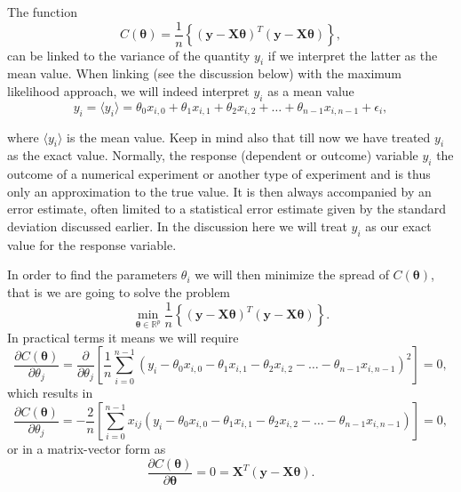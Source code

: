 \documentclass[%
oneside,                 %
final,                   %
10pt]{article}
\newenvironment{block_mdfboxadmon}[1][]{
\begin{block_mdfboxmdframed}[frametitle=#1]
}
{
\end{block_mdfboxmdframed}
}
\begin{document}

\begin{block_mdfboxadmon}[]

The function 
\[
C(\bm{\theta})=\frac{1}{n}\left\{\left(\bm{y}-\bm{X}\bm{\theta}\right)^T\left(\bm{y}-\bm{X}\bm{\theta}\right)\right\},
\]
can be linked to the variance of the quantity $y_i$ if we interpret the latter as the mean value. 
When linking (see the discussion below) with the maximum likelihood approach, we will indeed interpret $y_i$ as a mean value
\[
y_{i}=\langle y_i \rangle = \theta_0x_{i,0}+\theta_1x_{i,1}+\theta_2x_{i,2}+\dots+\theta_{n-1}x_{i,n-1}+\epsilon_i,
\]

where $\langle y_i \rangle$ is the mean value. Keep in mind also that
till now we have treated $y_i$ as the exact value. Normally, the
response (dependent or outcome) variable $y_i$ the outcome of a
numerical experiment or another type of experiment and is thus only an
approximation to the true value. It is then always accompanied by an
error estimate, often limited to a statistical error estimate given by
the standard deviation discussed earlier. In the discussion here we
will treat $y_i$ as our exact value for the response variable.

In order to find the parameters $\theta_i$ we will then minimize the spread of $C(\bm{\theta})$, that is we are going to solve the problem
\[
{\displaystyle \min_{\bm{\theta}\in
{\mathbb{R}}^{p}}}\frac{1}{n}\left\{\left(\bm{y}-\bm{X}\bm{\theta}\right)^T\left(\bm{y}-\bm{X}\bm{\theta}\right)\right\}.
\]
In practical terms it means we will require
\[
\frac{\partial C(\bm{\theta})}{\partial \theta_j} = \frac{\partial }{\partial \theta_j}\left[ \frac{1}{n}\sum_{i=0}^{n-1}\left(y_i-\theta_0x_{i,0}-\theta_1x_{i,1}-\theta_2x_{i,2}-\dots-\theta_{n-1}x_{i,n-1}\right)^2\right]=0, 
\]
which results in
\[
\frac{\partial C(\bm{\theta})}{\partial \theta_j} = -\frac{2}{n}\left[ \sum_{i=0}^{n-1}x_{ij}\left(y_i-\theta_0x_{i,0}-\theta_1x_{i,1}-\theta_2x_{i,2}-\dots-\theta_{n-1}x_{i,n-1}\right)\right]=0, 
\]
or in a matrix-vector form as
\[
\frac{\partial C(\bm{\theta})}{\partial \bm{\theta}} = 0 = \bm{X}^T\left( \bm{y}-\bm{X}\bm{\theta}\right).  
\]
\end{block_mdfboxadmon} %




\end{document}
